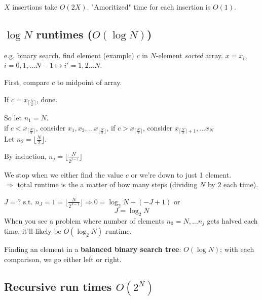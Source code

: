 \documentclass[10pt]{amsart}
\begin{document}
\begin{multicols*}{2}
 $X$ insertions take $O(2X)$.  "Amoritized" time for each insertion is $O(1)$.
 
\subsection{$\log{N}$ runtimes ($O(\log{N})$)} 

e.g. binary search. find element (example) $c$ in $N$-element \emph{sorted} array. $x= x_i$, $i=0,1, \dots N-1 \mapsto i' = 1, 2 \dots N$. 

First, compare $c$ to midpoint of array. 

If $c= x_{ \lceil \frac{N}{2} \rceil }$, done.

So let $n_1 =N$.  \\

if $c< x_{ \lceil \frac{N}{2} \rceil }$, consider $x_1, x_2, \dots x_{ \lfloor \frac{N}{2} \rfloor }$, if $c> x_{ \lceil \frac{N}{2} \rceil }$, consider $x_{ \lceil \frac{N}{2} \rceil + 1},  \dots x_N$ \\
 
Let $n_2= \lfloor \frac{N}{2} \rfloor$. 

By induction, $n_j = \lfloor \frac{N}{2^{j-1}} \rfloor$

We stop when we either find the value $c$ or we're down to just 1 element. \\
$\Longrightarrow $ total runtime is the a matter of how many steps (dividing $N$ by 2 each time).

$J = ?$ s.t. $n_J = 1 = \lfloor \frac{N}{2^{J-1}} \rfloor \Longrightarrow  0 = \log_2{N} + (-J + 1)$ or 
\[
J = \log_2{N}
\]
When you see a problem where number of elements $n_0 = N, \dots n_j$ gets halved each time, it'll likely be $O(\log_2{N})$ runtime. 

Finding an element in a \textbf{balanced binary search tree}: $O(\log{N})$; with each comparison, we go either left or right.

\subsection{Recursive run times $O(2^N)$}


\end{multicols*}
\end{document}
